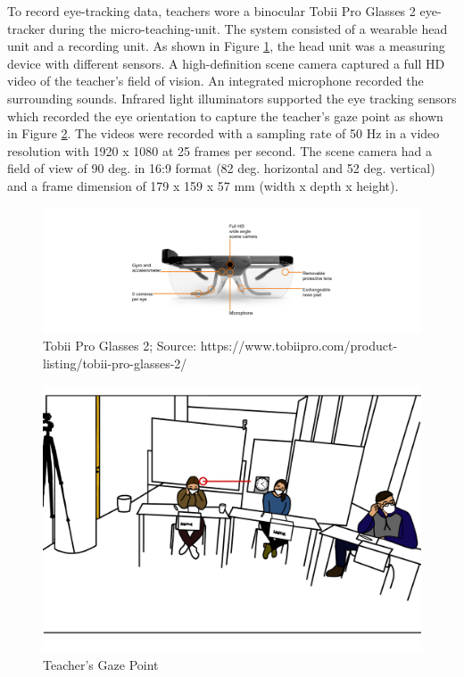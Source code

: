 \documentclass[
  man]{apa6}
\begin{document}
To record eye-tracking data, teachers wore a binocular Tobii Pro Glasses 2 eye-tracker during the micro-teaching-unit. The system consisted of a wearable head unit and a recording unit. As shown in Figure \ref{fig:tobiiglasses2}, the head unit was a measuring device with different sensors. A high-definition scene camera captured a full HD video of the teacher's field of vision. An integrated microphone recorded the surrounding sounds. Infrared light illuminators supported the eye tracking sensors which recorded the eye orientation to capture the teacher's gaze point as shown in Figure \ref{fig:teachersgaze}. The videos were recorded with a sampling rate of 50 Hz in a video resolution with 1920 x 1080 at 25 frames per second. The scene camera had a field of view of 90 deg. in 16:9 format (82 deg. horizontal and 52 deg. vertical) and a frame dimension of 179 x 159 x 57 mm (width x depth x height).

\begin{figure}

{\centering \includegraphics[width=14.07in]{./pictures/tobiiglasses2} 

}

\caption{Tobii Pro Glasses 2; Source: https://www.tobiipro.com/product-listing/tobii-pro-glasses-2/}\label{fig:tobiiglasses2}
\end{figure}

\begin{figure}

{\centering \includegraphics{./pictures/teachersgaze} 

}

\caption{Teacher's Gaze Point}\label{fig:teachersgaze}
\end{figure}
\end{document}
